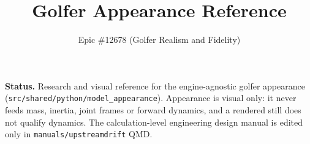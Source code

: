 \documentclass[11pt]{article}
\title{Golfer Appearance Reference}
\date{Epic \#12678 (Golfer Realism and Fidelity)}
\begin{document}
\maketitle
\noindent\textbf{Status.} Research and visual reference for the engine-agnostic
golfer appearance (\texttt{src/shared/python/model\_appearance}). Appearance is
visual only: it never feeds mass, inertia, joint frames or forward dynamics, and
a rendered still does not qualify dynamics. The calculation-level engineering
design manual is edited only in \texttt{manuals/upstreamdrift} QMD.
\end{document}
